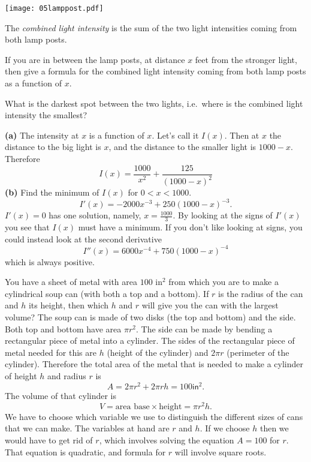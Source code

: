 \begin{multicols}{2}
\centerline{\texttt{[image: 05lamppost.pdf]}}




The \textit{combined light intensity} is the sum of the two light
intensities coming from both lamp posts.




\subprob If you are in between the lamp posts, at distance $x$
feet from the stronger light, then give a formula for the combined light
intensity coming from both lamp posts as a function of $x$.




\subprob What is the darkest spot between the two lights, i.e.\
where is the combined light intensity the smallest?




\answer %
\textbf{(a)} The intensity at $x$ is a function of $x$.  Let's
call it $I(x)$.  Then at $x$ the distance to the big light is
$x$, and the distance to the smaller light is $1000-x$. Therefore
\[
  I(x) = \frac{1000}{x^2} + \frac{125}{(1000-x)^2}
\]
\textbf{(b)} Find the minimum of $I(x)$ for $0<x<1000$.
\[
  I'(x) = -2000 x^{-3} + 250(1000 - x)^{-3}.
\]
$I'(x) = 0$ has one solution, namely, $x= \frac{1000}{3}$.
By looking at the signs of $I'(x)$ you see that $I(x)$ must have a
minimum.  If you don't like looking at signs, you could instead
look at the second derivative
\[
  I''(x) = 6000 x^{-4} + 750 (1000 - x)^{-4}
\]
which is always positive.
\endanswer








\problem  %
\subprob You have a sheet of metal with area $100\text{ in}^2$
from which you are to make a cylindrical soup can (with both a top and a bottom).  If $r$ is the
radius of the can and $h$ its height, then which $h$ and $r$ will
give you the can with the largest volume?
\answer %
The soup can is made of two disks (the top and bottom) and the side.
Both top and bottom have area $\pi r^2$.
The side can be made by bending a rectangular piece of metal into
a cylinder.  The sides of the rectangular piece of metal needed for
this are $h$ (height of the cylinder) and $2\pi r$ (perimeter of
the cylinder).  Therefore the total area of the metal that is needed
to make a cylinder of height $h$ and radius $r$ is
\[
A = 2\pi r^2 + 2\pi rh = 100 \mathsf{in}^2.
\]
The volume of that cylinder is
\[
V = \text{area base} \times \text{height} = \pi r^2h.
\]
We have to choose which variable we use to distinguish the different
sizes of cans that we can make.  The variables at hand are $r$
and $h$.  If we choose $h$ then we would have to get rid of $r$,
which involves solving the equation $A=100$ for $r$.  That equation
is quadratic, and formula for $r$ will involve square roots.





\end{multicols}
